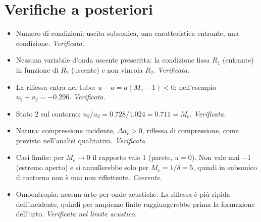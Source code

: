 \documentclass[11pt,a4paper]{article}
\newcommand{\Ru}{R_1}
\newcommand{\Rd}{R_2}
\newcommand{\Me}{M_e}
\begin{document}
\section{Verifiche a posteriori}
\begin{itemize}
  \item Numero di condizioni: uscita subsonica, una caratteristica entrante, una condizione. \emph{Verificata.}
  \item Nessuna variabile d'onda uscente prescritta: la condizione fissa $\Ru$ (entrante) in funzione di $\Rd$
    (uscente) e non vincola $\Rd$. \emph{Verificata.}
  \item La riflessa entra nel tubo: $u-a=a(\Me-1)<0$; nell'esempio $u_2-a_2=\num{-0.296}$. \emph{Verificata.}
  \item Stato 2 sul contorno: $u_2/a_2=\num{0.728}/\num{1.024}=\num{0.711}=\Me$. \emph{Verificata.}
  \item Natura: compressione incidente, $\Delta a_r>0$, riflessa di compressione, come previsto nell'analisi
    qualitativa. \emph{Verificata.}
  \item Casi limite: per $\Me\to0$ il rapporto vale 1 (parete, $u=0$). Non vale mai $-1$ (estremo aperto) e si
    annullerebbe solo per $\Me=1/\delta=5$, quindi in subsonico il contorno non è mai non riflettente.
    \emph{Coerente.}
  \item Omoentropia: nessun urto per onde acustiche. La riflessa è più ripida dell'incidente, quindi per ampiezze
    finite raggiungerebbe prima la formazione dell'urto. \emph{Verificata nel limite acustico.}
\end{itemize}

\end{document}
